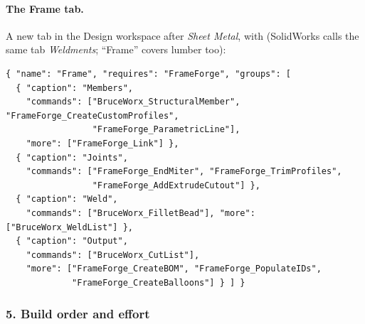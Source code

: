 \paragraph{The Frame tab.} A new tab in the Design workspace after \emph{Sheet Metal}, with 
(SolidWorks calls the same tab \emph{Weldments}; ``Frame'' covers lumber too):
\begin{lstlisting}[language={}]
{ "name": "Frame", "requires": "FrameForge", "groups": [
  { "caption": "Members",
    "commands": ["BruceWorx_StructuralMember", "FrameForge_CreateCustomProfiles",
                 "FrameForge_ParametricLine"],
    "more": ["FrameForge_Link"] },
  { "caption": "Joints",
    "commands": ["FrameForge_EndMiter", "FrameForge_TrimProfiles",
                 "FrameForge_AddExtrudeCutout"] },
  { "caption": "Weld",
    "commands": ["BruceWorx_FilletBead"], "more": ["BruceWorx_WeldList"] },
  { "caption": "Output",
    "commands": ["BruceWorx_CutList"],
    "more": ["FrameForge_CreateBOM", "FrameForge_PopulateIDs",
             "FrameForge_CreateBalloons"] } ] }
\end{lstlisting}

\subsubsection*{5. Build order and effort}

